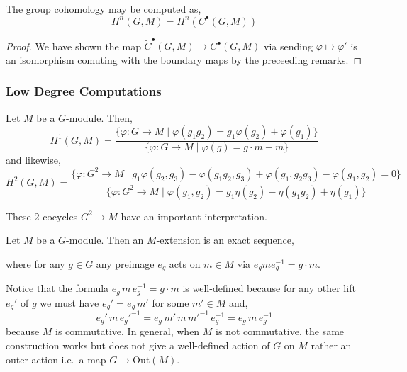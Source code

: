 \documentclass[12pt]{article}
\begin{document}
\begin{prop}
The group cohomology may be computed as,
\[ H^n(G, M) = H^n(C^\bullet(G, M)) \]
\end{prop}

\begin{proof}
We have shown the map $\tilde{C}^\bullet(G, M) \to C^\bullet(G, M)$ via sending $\varphi \mapsto \varphi'$ is an isomorphism comuting with the boundary maps by the preceeding remarks.
\end{proof}

\subsubsection{Low Degree Computations}

\begin{prop}
Let $M$ be a $G$-module. Then,
\[ H^1(G, M) = \frac{ \{ \varphi : G \to M \mid \varphi(g_1 g_2) = g_1 \varphi(g_2) + \varphi(g_1) \} }{\{ \varphi : G \to M \mid  \varphi(g) = g \cdot m - m \}} \]
and likewise,
\[ H^2(G, M) = \frac{\{ \varphi : G^2 \to M \mid g_1 \varphi(g_2, g_3) - \varphi(g_1 g_2, g_3) + \varphi(g_1, g_2 g_3) - \varphi(g_1, g_2) = 0 \}}{\{ \varphi : G^2 \to M \mid \varphi(g_1, g_2) = g_1 \eta(g_2) - \eta(g_1 g_2) + \eta(g_1) \}} \]
\end{prop}

\begin{rmk}
These $2$-cocycles $G^2 \to M$ have an important interpretation.
\end{rmk}

\begin{defn}
Let $M$ be a $G$-module. Then an $M$-extension is an exact sequence,
\begin{center}
\end{center}
where for any $g \in G$ any preimage $e_g$ acts on $m \in M$ via $e_g m e_g^{-1} = g \cdot m$.
\end{defn}

\begin{rmk}
Notice that the formula $e_g \, m  \, e_g^{-1} = g \cdot m$ is well-defined because for any other lift $e_g'$ of $g$ we must have $e_g' = e_g \, m'$ for some $m' \in M$ and,
\[ e_g' \, m \, e_g'^{-1} = e_g \, m' \, m \, m'^{-1} \, e_g^{-1} = e_g \, m \, e_g^{-1} \]
because $M$ is commutative. In general, when $M$ is not commutative, the same construction works but does not give a well-defined action of $G$ on $M$ rather an outer action i.e.\ a map $G \to \mathrm{Out}\left( M \right)$.
\end{rmk}
\end{document}
